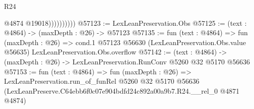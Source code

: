 \begin{lexlean}{R24}
\begin{coremodule}
                        @4874
                        @19018))))))))))
@57123 := LexLeanPreservation.Obs
@57125 := (text : @4864) -> (maxDepth : @26) -> @57123
@57135 := fun (text : @4864) =>
  fun (maxDepth : @26) =>
  cond.{1} @57123 @56630 (LexLeanPreservation.Obs.value @56635) LexLeanPreservation.Obs.overflow
@57142 := (text : @4864) -> (maxDepth : @26) -> LexLeanPreservation.RunConv @5260 @32 @5170 @56636
@57153 := fun (text : @4864) =>
  fun (maxDepth : @26) =>
  LexLeanPreservation.run_of_funRel
    @5260
    @32
    @5170
    @56636
    (LexLeanPreserve.C64ebb6f0c07e904bdfd24c892a00a9b7.R24.__rel_0 @4871 @4874)
\end{coremodule}
\end{lexlean}
